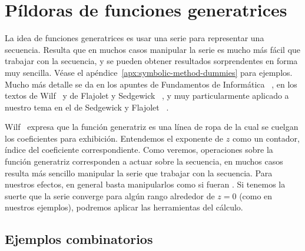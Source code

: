 

\chapter{Píldoras de funciones generatrices}
\label{apx:funciones-generatrices}

  La idea de funciones generatrices es usar una serie
  para representar una secuencia.
  Resulta que en muchos casos manipular la serie es mucho más fácil
  que trabajar con la secuencia,
  y se pueden obtener resultados sorprendentes en forma muy sencilla.
  Véase el apéndice~\ref{apx:symbolic-method-dummies} para ejemplos.
  Mucho más detalle se da en los apuntes de Fundamentos de Informática~%
    \cite{brand17:_fundamentos_informatica},
  en los textos de Wilf~%
    \cite{wilf06:_gfology}
  y de Flajolet y Sedgewick~%
    \cite{flajolet09:_analy_combin},
  y muy particularmente aplicado a nuestro tema en el de
  Sedgewick y Flajolet~%
    \cite{sedgewick13:_introd_anal_algor}.

  Wilf~\cite{wilf06:_gfology} expresa
  que la función generatriz es una línea de ropa
  de la cual se cuelgan los coeficientes para exhibición.
  Entendemos el exponente de \(z\) como un contador,
  índice del coeficiente correspondiente.
  Como veremos,
  operaciones sobre la función generatriz
  corresponden a actuar sobre la secuencia,
  en muchos casos resulta más sencillo manipular la serie
  que trabajar con la secuencia.
  Para nuestros efectos,
  en general basta manipularlos como si fueran .
  Si tenemos la suerte que la serie converge para algún rango
  alrededor de \(z = 0\)
  (como en nuestros ejemplos),
  podremos aplicar las herramientas del cálculo.

\section{Ejemplos combinatorios}
\label{sec:gf-ejemplos-combinatorios}

